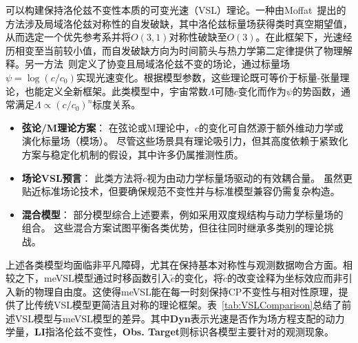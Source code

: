 \documentclass[jkps,preprint,fleqn]{revtex4}
\newcommand{\tc}{\tilde{c}}
\begin{document}
可以构建保持洛伦兹不变性本质的可变光速（VSL）理论。一种由Moffat~\cite{Moffat:1992ud}提出的方法涉及局域洛伦兹对称性的自发破缺，其中洛伦兹标量场获得类时真空期望值，从而选定一个优先参考系并将$O(3,1)$对称性破缺至$O(3)$。在此框架下，光速经历相变至当前较小值，而自发破缺方向为时间箭头与热力学第二定律提供了物理解释。另一方法~\cite{Magueijo:2000zt}则定义了协变且局域洛伦兹不变的场论，通过标量场$\psi = \log(c/c_0)$实现光速变化。根据模型参数，这些理论既可等价于标量-张量理论，也能定义全新框架。此类模型中，宇宙常数$\Lambda$可随$c$变化而作为$\psi$的势函数，通常满足$\Lambda \propto (c/c_0)^n$标度关系\cite{Manida:1999rx,Barrow:1999st,Stepanov:1999ax,Magueijo:2000au,Moffat:2002nm}。

\begin{itemize}
  \item \textbf{弦论/M理论方案}：
    在弦论或M理论中，$c$的变化可自然源于额外维动力学或演化标量场（模场）\cite{Kaelbermann:1998hu,Randall:1999ee,Randall:1999vf,Kiritsis:1999tx,Chung:1999xg,Alexander:1999cb,Ishihara:2000nf,Csaki:2000dm,Youm:2001sw,Youm:2001zk,Grojean:2001pv,Youm:2001zp}。
    尽管这些场景具有理论吸引力，但其高度依赖于紧致化方案与稳定化机制的假设，其中许多仍属推测性质。
   \item \textbf{场论VSL预言}：
    此类方法将$c$视为由动力学标量场驱动的有效耦合量\cite{Drummond:1979pp,Novello:1988ma,Barton:1989dq,Scharnhorst:1990sr,Shore:1995fz,Colladay:1995qb,Coleman:1998ti,Bertolami:1999da,Shore:2000bs,Greenberg:2002uu,Teyssandier:2003qh,Shore:2003zc,Blasone:2003wf}。
    虽然更贴近标准场论技术，但要确保规范不变性并与标准模型兼容仍需复杂构造。
    \item \textbf{混合模型}：
    部分模型综合上述要素，例如采用双度规结构与动力学标量场的组合\cite{Alexander:2001dr,Burgess:2002tb}。
    这些混合方案试图平衡各类优势，但往往同时继承多类别的理论挑战。
\end{itemize}

上述各类模型均面临非平凡障碍，尤其在保持基本对称性与观测数据吻合方面。相较之下，meVSL模型通过时移函数引入$\tc$的变化，将$\tc$的改变诠释为坐标效应而非引入新的物理自由度。这使得meVSL能在每一时刻保持CP不变性与相对性原理，提供了比传统VSL模型更简洁且对称的理论框架。表~\ref{tab:VSLComparison}总结了前述VSL模型与meVSL模型的差异。其中\textbf{Dyn}表示光速是否作为场方程支配的动力学量，\textbf{LI}指洛伦兹不变性，\textbf{Obs. Target}则标识各模型主要针对的观测现象。
\end{document}
